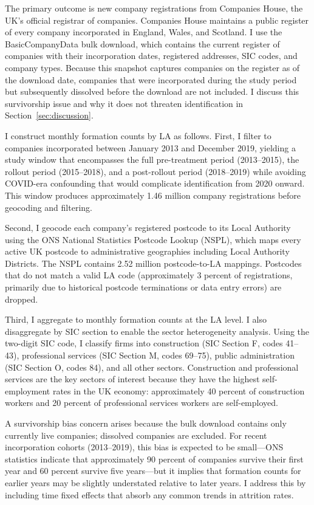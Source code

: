 \documentclass[12pt]{article}
\begin{document}
The primary outcome is new company registrations from Companies House, the UK's official registrar of companies. Companies House maintains a public register of every company incorporated in England, Wales, and Scotland. I use the BasicCompanyData bulk download, which contains the current register of companies with their incorporation dates, registered addresses, SIC codes, and company types. Because this snapshot captures companies on the register as of the download date, companies that were incorporated during the study period but subsequently dissolved before the download are not included. I discuss this survivorship issue and why it does not threaten identification in Section~\ref{sec:discussion}.

I construct monthly formation counts by LA as follows. First, I filter to companies incorporated between January 2013 and December 2019, yielding a study window that encompasses the full pre-treatment period (2013--2015), the rollout period (2015--2018), and a post-rollout period (2018--2019) while avoiding COVID-era confounding that would complicate identification from 2020 onward. This window produces approximately 1.46 million company registrations before geocoding and filtering.

Second, I geocode each company's registered postcode to its Local Authority using the ONS National Statistics Postcode Lookup (NSPL), which maps every active UK postcode to administrative geographies including Local Authority Districts. The NSPL contains 2.52 million postcode-to-LA mappings. Postcodes that do not match a valid LA code (approximately 3 percent of registrations, primarily due to historical postcode terminations or data entry errors) are dropped.

Third, I aggregate to monthly formation counts at the LA level. I also disaggregate by SIC section to enable the sector heterogeneity analysis. Using the two-digit SIC code, I classify firms into construction (SIC Section F, codes 41--43), professional services (SIC Section M, codes 69--75), public administration (SIC Section O, codes 84), and all other sectors. Construction and professional services are the key sectors of interest because they have the highest self-employment rates in the UK economy: approximately 40 percent of construction workers and 20 percent of professional services workers are self-employed.

A survivorship bias concern arises because the bulk download contains only currently live companies; dissolved companies are excluded. For recent incorporation cohorts (2013--2019), this bias is expected to be small---ONS statistics indicate that approximately 90 percent of companies survive their first year and 60 percent survive five years---but it implies that formation counts for earlier years may be slightly understated relative to later years. I address this by including time fixed effects that absorb any common trends in attrition rates.
\end{document}
